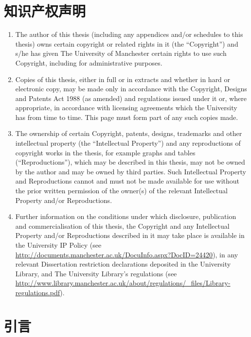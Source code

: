 \documentclass[12pt, a4paper]{article}
\begin{document}
\section*{知识产权声明}
\begin{enumerate}[label=\roman*.]
    \item The author of this thesis (including any appendices and/or schedules to this thesis) owns certain copyright or related rights in it (the ``Copyright'') and s/he has given The University of Manchester certain rights to use such Copyright, including for administrative purposes.
    \item Copies of this thesis, either in full or in extracts and whether in hard or electronic copy, may be made only in accordance with the Copyright, Designs and Patents Act 1988 (as amended) and regulations issued under it or, where appropriate, in accordance with licensing agreements which the University has from time to time. This page must form part of any such copies made.
    \item The ownership of certain Copyright, patents, designs, trademarks and other intellectual property (the ``Intellectual Property'') and any reproductions of copyright works in the thesis, for example graphs and tables (``Reproductions''), which may be described in this thesis, may not be owned by the author and may be owned by third parties. Such Intellectual Property and Reproductions cannot and must not be made available for use without the prior written permission of the owner(s) of the relevant Intellectual Property and/or Reproductions.
    \item Further information on the conditions under which disclosure, publication and commercialisation of this thesis, the Copyright and any Intellectual Property and/or Reproductions described in it may take place is available in the University IP Policy (see \url{http://documents.manchester.ac.uk/DocuInfo.aspx?DocID=24420}), in any relevant Dissertation restriction declarations deposited in the University Library, and The University Library's regulations (see \url{http://www.library.manchester.ac.uk/about/regulations/_files/Library-regulations.pdf}).
\end{enumerate}

\newpage
\tableofcontents

\newpage
\listoffigures
\listoftables

\newpage
{}
\section{引言}
\end{document}
